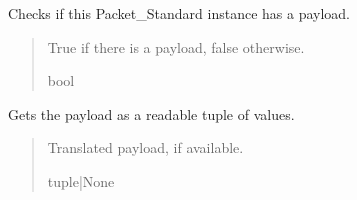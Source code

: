 \documentclass[letterpaper,10pt,english]{sphinxmanual}
\begin{document}
\begin{fulllineitems}
\begin{fulllineitems}
\begin{quote}
\begin{description}
\end{description}\end{quote}

\end{fulllineitems}


\begin{fulllineitems}
\label{\detokenize{Morelia.Packets:Morelia.Packets.Standard.PacketStandard.HasPayload}}
\pysigstartsignatures
{}
\pysigstopsignatures
\sphinxAtStartPar
Checks if this Packet\_Standard instance has a payload.
\begin{quote}\begin{description}
\sphinxAtStartPar
True if there is a payload, false otherwise.

\sphinxAtStartPar
bool

\end{description}\end{quote}

\end{fulllineitems}


\begin{fulllineitems}
\label{\detokenize{Morelia.Packets:Morelia.Packets.Standard.PacketStandard.Payload}}
\pysigstartsignatures
{}
\pysigstopsignatures
\sphinxAtStartPar
Gets the payload as a readable tuple of values.
\begin{quote}\begin{description}
\sphinxAtStartPar
Translated payload, if available.

\sphinxAtStartPar
tuple|None

\end{description}\end{quote}

\end{fulllineitems}



\end{fulllineitems}
\end{document}
